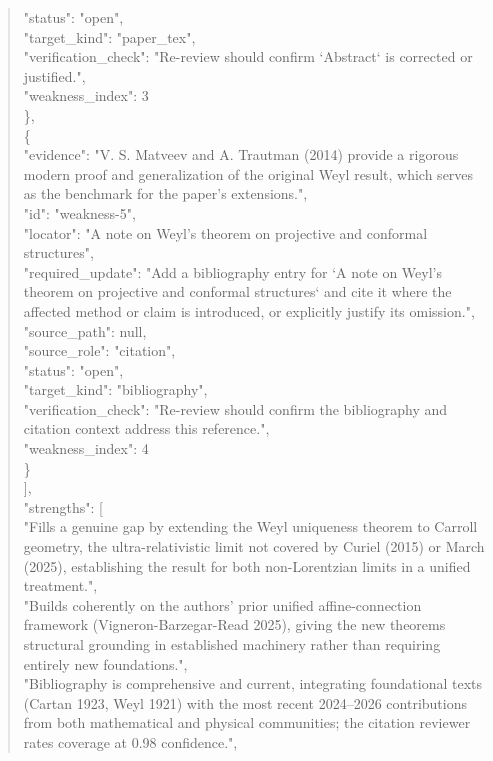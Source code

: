\documentclass[11pt]{article}
\begin{document}
\begin{quote}
      "status": "open",\\
      "target\_kind": "paper\_tex",\\
      "verification\_check": "Re-review should confirm `Abstract` is corrected or justified.",\\
      "weakness\_index": 3\\
    \},\\
    \{\\
      "evidence": "V. S. Matveev and A. Trautman (2014) provide a rigorous modern proof and generalization of the original Weyl result, which serves as the benchmark for the paper's extensions.",\\
      "id": "weakness-5",\\
      "locator": "A note on Weyl's theorem on projective and conformal structures",\\
      "required\_update": "Add a bibliography entry for `A note on Weyl's theorem on projective and conformal structures` and cite it where the affected method or claim is introduced, or explicitly justify its omission.",\\
      "source\_path": null,\\
      "source\_role": "citation",\\
      "status": "open",\\
      "target\_kind": "bibliography",\\
      "verification\_check": "Re-review should confirm the bibliography and citation context address this reference.",\\
      "weakness\_index": 4\\
    \}\\
  ],\\
  "strengths": [\\
    "Fills a genuine gap by extending the Weyl uniqueness theorem to Carroll geometry, the ultra-relativistic limit not covered by Curiel (2015) or March (2025), establishing the result for both non-Lorentzian limits in a unified treatment.",\\
    "Builds coherently on the authors' prior unified affine-connection framework (Vigneron-Barzegar-Read 2025), giving the new theorems structural grounding in established machinery rather than requiring entirely new foundations.",\\
    "Bibliography is comprehensive and current, integrating foundational texts (Cartan 1923, Weyl 1921) with the most recent 2024–2026 contributions from both mathematical and physical communities; the citation reviewer rates coverage at 0.98 confidence.",\\

\end{quote}
\end{document}
